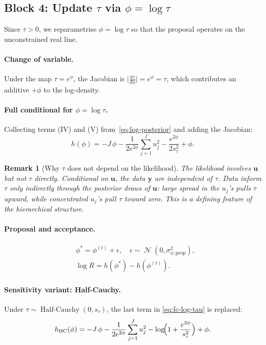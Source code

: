 \documentclass[11pt]{article}
\newtheorem{remark}{Remark}
\newcommand{\by}{\bm{y}}
\newcommand{\bu}{\bm{u}}
\DeclareMathOperator{\Normal}{\mathcal{N}}
\DeclareMathOperator{\HalfCauchy}{Half\text{-}Cauchy}
\begin{document}
\subsection{Block 4: Update $\tau$ via $\phi = \log\tau$}
\label{sec:block-tau}

Since $\tau > 0$, we reparametrise $\phi = \log\tau$ so that the
proposal operates on the unconstrained real line.

\paragraph{Change of variable.}
Under the map $\tau = e^\phi$, the Jacobian is
$\bigl|\frac{d\tau}{d\phi}\bigr| = e^\phi = \tau$,
which contributes an additive $+\phi$ to the log-density.

\paragraph{Full conditional for $\phi = \log\tau$.}
Collecting terms (IV) and (V) from~\eqref{eq:log-posterior} and adding
the Jacobian:
\begin{equation}\label{eq:fc-log-tau}
  h(\phi)
  = -J\,\phi
    - \frac{1}{2e^{2\phi}}\sum_{j=1}^{J}u_j^2
    - \frac{e^{2\phi}}{2s_\tau^2}
    + \phi.
\end{equation}

\begin{remark}[Why $\tau$ does not depend on the likelihood]
The likelihood involves $\bu$ but not $\tau$ directly.
Conditional on $\bu$, the data $\by$ are independent of $\tau$.
Data inform $\tau$ only \emph{indirectly} through the posterior draws
of $\bu$: large spread in the $u_j$'s pulls $\tau$ upward, while
concentrated $u_j$'s pull $\tau$ toward zero.
This is a defining feature of the hierarchical structure.
\end{remark}

\paragraph{Proposal and acceptance.}
\begin{align}
  &\phi^* = \phi^{(t)} + \epsilon, \quad \epsilon \sim \Normal(0,\sigma_{\phi,\text{prop}}^2), \label{eq:prop-tau}\\
  &\log R = h(\phi^*) - h(\phi^{(t)}). \label{eq:ar-tau}
\end{align}

\paragraph{Sensitivity variant: Half-Cauchy.}
Under $\tau \sim \HalfCauchy(0,s_\tau)$, the last term in
\eqref{eq:fc-log-tau} is replaced:
\begin{equation}\label{eq:fc-log-tau-hc}
  h_{\text{HC}}(\phi)
  = -J\,\phi
    - \frac{1}{2e^{2\phi}}\sum_{j=1}^{J}u_j^2
    - \log\!\Bigl(1 + \frac{e^{2\phi}}{s_\tau^2}\Bigr)
    + \phi.
\end{equation}
\end{document}
